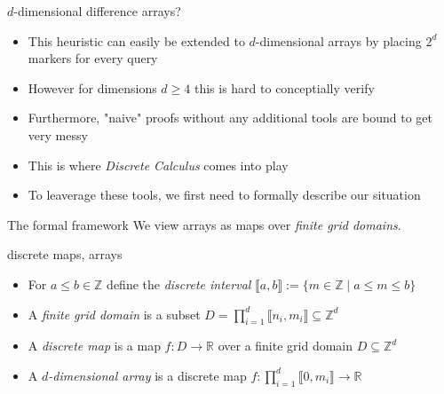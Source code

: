 \documentclass[
    t,10pt,
    handout
]{beamer}
\begin{document}
\begin{frame}{\(d\)-dimensional difference arrays?}
    \begin{itemize}[<+->]
	\item This heuristic can easily be extended to \( d \)-dimensional arrays by placing \( 2^d \) markers for every query 

	\item However for dimensions \( d \geq 4 \) this is hard to conceptially verify

	\item Furthermore, "naive" proofs without any additional tools are bound to get very messy 

	\item This is where \emph{Discrete Calculus} comes into play

	\item To leaverage these tools, we first need to formally describe our situation
    \end{itemize}

\end{frame}

\begin{frame}{The formal framework}
    We view arrays as maps over \emph{finite grid domains}. 

    \begin{definition*}{discrete maps, arrays}
        \begin{itemize}[<+->]
            \item For \( a \leq b \in \mathbb{Z} \) define the \emph{discrete interval} \( \llbracket a, b \rrbracket := \{ m \in \mathbb{Z} \mid a \leq m \leq b \} \)
            \item A \emph{finite grid domain} is a subset \( D = \prod_{i=1}^d \llbracket n_i, m_i \rrbracket \subseteq \mathbb{Z}^d \)
            \item A \emph{discrete map} is a map \( f : D \to \mathbb{R} \) over a finite grid domain \( D \subseteq \mathbb{Z}^d \) 
            \item A \emph{\(d\)-dimensional array} is a discrete map \( f : \prod_{i=1}^d \llbracket 0, m_i \rrbracket \to \mathbb{R} \)
        \end{itemize}
    \end{definition*}

\end{frame}
\end{document}
